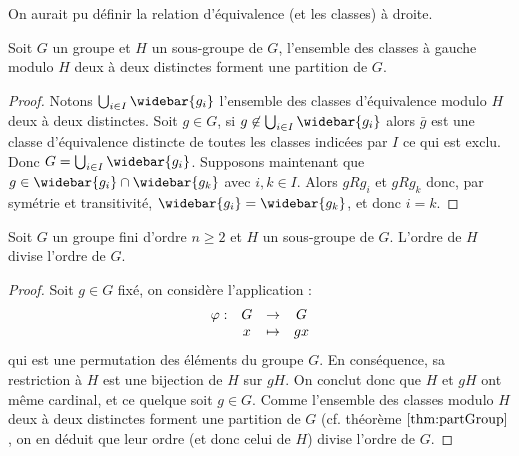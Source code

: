 \begin{rmq}
On aurait pu définir la relation d'équivalence (et les classes) à droite.
\end{rmq}


\begin{thm}
\label{thm:partGroup}
Soit $G$ un groupe et $H$ un sous-groupe de $G$, l'ensemble des classes à gauche modulo $H$ deux à deux distinctes
forment une partition de $G$.
\end{thm}

\begin{proof}
Notons $\bigcup_{i \in I} \widebar{g_i}$ l'ensemble des classes d'équivalence modulo $H$ deux à deux distinctes.
Soit $g \in G$, si $g \not \in \bigcup_{i \in I} \widebar{g_i}$ alors $\bar{g}$ est une classe d'équivalence distincte de toutes les classes
indicées par $I$ ce qui est exclu. Donc $G = \bigcup_{i \in I} \widebar{g_i}$. 
Supposons maintenant que $g \in \widebar{g_i} \cap \widebar{g_k}$ avec $i, k \in I$. 
Alors $g R g_i$ et $g R g_k$ donc, par symétrie et transitivité, $\widebar{g_i} = \widebar{g_k}$, et donc $i=k$.
\end{proof}


\begin{thm}[Lagrange]
\label{thm:lagrange}
Soit $G$ un groupe fini d'ordre $n \geq 2$ et $H$ un sous-groupe de $G$. L'ordre de $H$ divise l'ordre de $G$.
\end{thm}

\begin{proof}
Soit $g \in G$ fixé, on considère l'application :
\[ \begin{array}{c c c c}
\varphi : & G & \to & G \\
& x & \mapsto & gx
\end{array} \]
qui est une permutation des éléments du groupe $G$. En conséquence, sa restriction à $H$ est une bijection de $H$ sur $gH$.
On conclut donc que $H$ et $gH$ ont même cardinal, et ce quelque soit $g \in G$. 
Comme l'ensemble des classes modulo $H$ deux à deux distinctes forment une partition de $G$ (cf. théorème $\ref{thm:partGroup}$, 
on en déduit que leur ordre (et donc celui de $H$) divise l'ordre de $G$. 
\end{proof}

